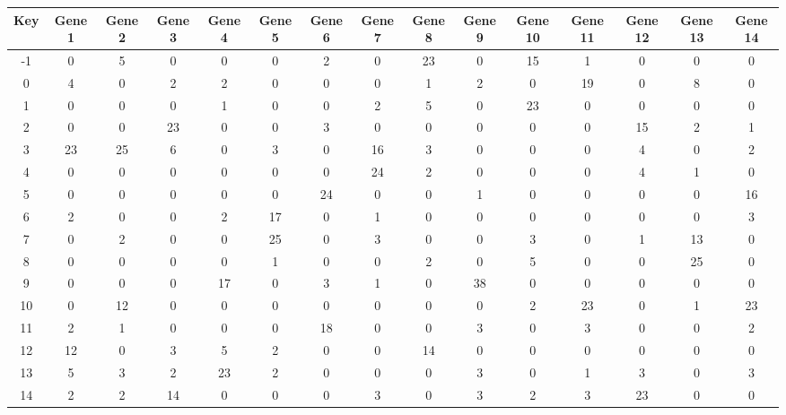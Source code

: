 \begin{tabular}{|c|c|c|c|c|c|c|c|c|c|c|c|c|c|c|}
\hline
Key & Gene 1 & Gene 2 & Gene 3 & Gene 4 & Gene 5 & Gene 6 & Gene 7 & Gene 8 & Gene 9 & Gene 10 & Gene 11 & Gene 12 & Gene 13 & Gene 14 \\
\hline
-1 & 0 & 5 & 0 & 0 & 0 & 2 & 0 & 23 & 0 & 15 & 1 & 0 & 0 & 0 \\
0 & 4 & 0 & 2 & 2 & 0 & 0 & 0 & 1 & 2 & 0 & 19 & 0 & 8 & 0 \\
1 & 0 & 0 & 0 & 1 & 0 & 0 & 2 & 5 & 0 & 23 & 0 & 0 & 0 & 0 \\
2 & 0 & 0 & 23 & 0 & 0 & 3 & 0 & 0 & 0 & 0 & 0 & 15 & 2 & 1 \\
3 & 23 & 25 & 6 & 0 & 3 & 0 & 16 & 3 & 0 & 0 & 0 & 4 & 0 & 2 \\
4 & 0 & 0 & 0 & 0 & 0 & 0 & 24 & 2 & 0 & 0 & 0 & 4 & 1 & 0 \\
5 & 0 & 0 & 0 & 0 & 0 & 24 & 0 & 0 & 1 & 0 & 0 & 0 & 0 & 16 \\
6 & 2 & 0 & 0 & 2 & 17 & 0 & 1 & 0 & 0 & 0 & 0 & 0 & 0 & 3 \\
7 & 0 & 2 & 0 & 0 & 25 & 0 & 3 & 0 & 0 & 3 & 0 & 1 & 13 & 0 \\
8 & 0 & 0 & 0 & 0 & 1 & 0 & 0 & 2 & 0 & 5 & 0 & 0 & 25 & 0 \\
9 & 0 & 0 & 0 & 17 & 0 & 3 & 1 & 0 & 38 & 0 & 0 & 0 & 0 & 0 \\
10 & 0 & 12 & 0 & 0 & 0 & 0 & 0 & 0 & 0 & 2 & 23 & 0 & 1 & 23 \\
11 & 2 & 1 & 0 & 0 & 0 & 18 & 0 & 0 & 3 & 0 & 3 & 0 & 0 & 2 \\
12 & 12 & 0 & 3 & 5 & 2 & 0 & 0 & 14 & 0 & 0 & 0 & 0 & 0 & 0 \\
13 & 5 & 3 & 2 & 23 & 2 & 0 & 0 & 0 & 3 & 0 & 1 & 3 & 0 & 3 \\
14 & 2 & 2 & 14 & 0 & 0 & 0 & 3 & 0 & 3 & 2 & 3 & 23 & 0 & 0 \\
\hline
\end{tabular}